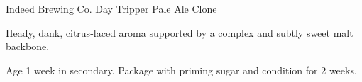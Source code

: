 \begin{recipe}{Indeed Brewing Co. Day Tripper Pale Ale Clone}

\begin{aboutblock}
Heady, dank, citrus-laced aroma supported by a complex and subtly sweet
malt backbone. \sourceaha
\end{aboutblock}


\begin{methodandtiming}
 
\begin{mashsteps}
\end{mashsteps}

\begin{fermentationsteps}
\end{fermentationsteps}

\begin{directions}
Age 1 week in secondary. Package with  priming sugar and condition
for 2 weeks.
\end{directions}

\end{methodandtiming}

\recipebreak

\begin{ingredientsblock}

\begin{malts}

\end{malts}

\begin{hops}
\end{hops}


\end{ingredientsblock}

\end{recipe}

